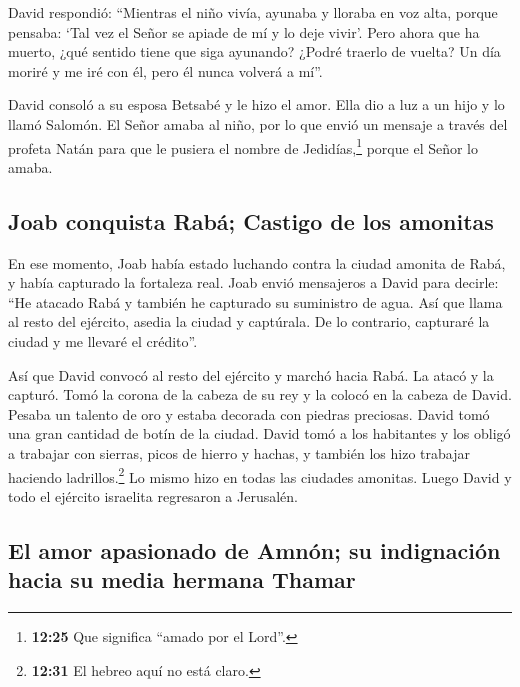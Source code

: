  David respondió: ``Mientras el niño vivía, ayunaba y
lloraba en voz alta, porque pensaba: `Tal vez el Señor se apiade de mí y
lo deje vivir'.  Pero ahora que ha muerto, ¿qué sentido
tiene que siga ayunando? ¿Podré traerlo de vuelta? Un día moriré y me
iré con él, pero él nunca volverá a mí''.

 David consoló a su esposa Betsabé y le hizo el amor.
Ella dio a luz a un hijo y lo llamó Salomón. El Señor amaba al niño,
 por lo que envió un mensaje a través del profeta Natán
para que le pusiera el nombre de Jedidías,\footnote{\textbf{12:25} Que
  significa ``amado por el Lord''.} porque el Señor lo amaba.

\hypertarget{joab-conquista-rabuxe1-castigo-de-los-amonitas}{%
\subsection{Joab conquista Rabá; Castigo de los
amonitas}\label{joab-conquista-rabuxe1-castigo-de-los-amonitas}}

 En ese momento, Joab había estado luchando contra la
ciudad amonita de Rabá, y había capturado la fortaleza real.
 Joab envió mensajeros a David para decirle: ``He atacado
Rabá y también he capturado su suministro de agua.  Así
que llama al resto del ejército, asedia la ciudad y captúrala. De lo
contrario, capturaré la ciudad y me llevaré el crédito''.

 Así que David convocó al resto del ejército y marchó
hacia Rabá. La atacó y la capturó.  Tomó la corona de la
cabeza de su rey y la colocó en la cabeza de David. Pesaba un talento de
oro y estaba decorada con piedras preciosas. David tomó una gran
cantidad de botín de la ciudad.  David tomó a los
habitantes y los obligó a trabajar con sierras, picos de hierro y
hachas, y también los hizo trabajar haciendo ladrillos.\footnote{\textbf{12:31}
  El hebreo aquí no está claro.} Lo mismo hizo en todas las ciudades
amonitas. Luego David y todo el ejército israelita regresaron a
Jerusalén.

\hypertarget{el-amor-apasionado-de-amnuxf3n-su-indignaciuxf3n-hacia-su-media-hermana-thamar}{%
\subsection{El amor apasionado de Amnón; su indignación hacia su media
hermana
Thamar}\label{el-amor-apasionado-de-amnuxf3n-su-indignaciuxf3n-hacia-su-media-hermana-thamar}}

